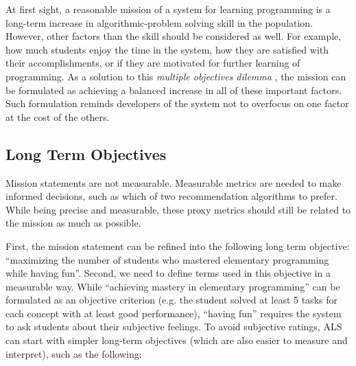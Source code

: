 At first sight, a reasonable mission of a system for learning programming
  is a long-term increase in algorithmic-problem solving skill in the population.
However, other factors than the skill should be considered as well.
For example, how much students enjoy the time in the system,
  how they are satisfied with their accomplishments,
  or if they are motivated for further learning of programming.
As a solution to this \emph{multiple objectives dilemma} \cite[][Rule 39]{google-ml-rules},
  the mission can be formulated as achieving a balanced increase in all
  of these important factors.
Such formulation reminds developers of the system not to overfocus on one factor
  at the cost of the others.


\subsection{Long Term Objectives}
\label{sec:long-term-objectives}


Mission statements are not measurable.
Measurable metrics are needed to make informed decisions,
such as which of two recommendation algorithms to prefer.
While being precise and measurable, these proxy metrics
should still be related to the mission as much as possible.

First, the mission statement can be refined into the following
  long term objective: ``maximizing the number of students
  who mastered elementary programming while having fun''.  %
Second, we need to define terms used in this objective in a measurable way.
While ``achieving mastery in elementary programming'' can be
  formulated as an objective criterion
  (e.g. the student solved at least 5 tasks for each concept with at least good performance),
  ``having fun'' requires the system to ask students about their subjective feelings.
To avoid subjective ratings, ALS can start with simpler long-term objectives
(which are also easier to measure and interpret), such as the following:

